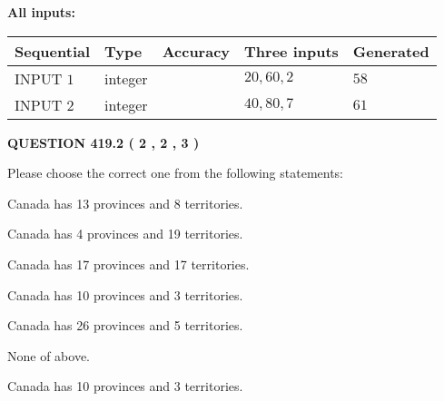 \documentclass[12pt]{article}
\begin{document}
   
   
   
\noindent{}
   
   
   
   
\noindent\vspace{0.1in}\hspace{-0.08in} {\textbf{\Large{All inputs: }}}
   
   
  
  
\noindent\begin{tabular}{|l|l|l|l|l|}
\hline
 Sequential & Type & Accuracy & Three inputs & Generated \\ 
\hline
 
 
  INPUT $  1 $ & integer &  & $
 20
 , 
 60
 , 
 2
 $ & $ 58 $ 
 \\  \hline  
 
 
  INPUT $  2 $ & integer &  & $
 40
 , 
 80
 , 
 7
 $ & $ 61 $ 
 \\  \hline  
 \end{tabular}
   
   
  
\vspace{0.2in}
  
{\textbf{\Large{QUESTION
419.2 
 ( 2 , 2 , 3 )
}}}
  
  
Please choose the correct one from the following statements:
 
 
Canada has  13 provinces and  8 territories.
 
 
Canada has   4 provinces and  19 territories.
 
 
Canada has  17 provinces and  17 territories.
 
 
Canada has 10  provinces and 3 territories.
 
 
Canada has  26 provinces and  5 territories.
 
 
 None of above.
 
 
\noindent{}
 
 
Canada has 10  provinces and 3 territories.
 
 
\noindent{}
 
 
   
\end{document}

